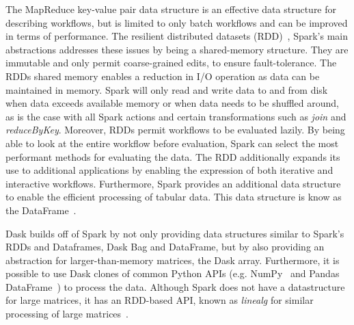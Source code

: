 \documentclass{report}
\begin{document}
                The MapReduce key-value pair data structure is an effective 
                data structure for describing workflows, but is limited to only
                batch workflows and can be improved in terms of performance. 
                The resilient distributed datasets 
                (RDD)~\cite{Zaharia:2012:RDD:2228298.2228301}, Spark's main
                abstractions addresses these 
                issues by being a shared-memory structure. They 
                are immutable and only permit coarse-grained edits, to ensure 
                fault-tolerance. The RDDs shared memory enables a reduction in
                I/O operation as data can be maintained in memory. Spark will only read 
                and write data to and from disk when data exceeds available 
                memory or when data needs to be shuffled around, as is the case
                with all Spark actions and certain transformations such as 
                \textit{join} and \textit{reduceByKey}. Moreover, RDDs permit
                workflows to be evaluated lazily. By being able to look at the
                entire workflow before evaluation, Spark can select the most
                performant methods for evaluating the data. 
                The RDD additionally expands its use to additional applications
                by enabling the expression of both iterative and interactive
                workflows. Furthermore, Spark provides an additional data 
                structure to enable the efficient processing of tabular data.
                This data structure is know as the 
                DataFrame~\cite{Armbrust:2015:SSR:2723372.2742797}.

                Dask builds off of Spark by not only providing data 
                structures similar to Spark's RDDs and Dataframes, Dask Bag and 
                DataFrame, but by also providing an abstraction for 
                larger-than-memory matrices, the Dask array. Furthermore, it is
                possible to use Dask clones of common Python APIs (e.g. NumPy~\cite{Oliphant:2015:GN:2886196} and 
                Pandas DataFrame~\cite{mckinney2011pandas}) to process the 
                data. Although Spark does not have a datastructure for large 
                matrices, it has an RDD-based API, known as \textit{linealg}
                for similar processing of large 
                matrices~\cite{BosaghZadeh:2016:MCO:2939672.2939675}.
\end{document}
